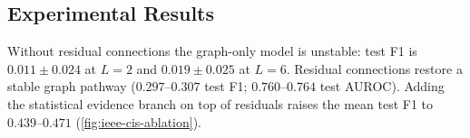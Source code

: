 \subsection{Experimental Results}
\label{sec:ieee-results}

Without residual connections the graph-only model is unstable: test F1 is
$0.011 \pm 0.024$ at $L=2$ and $0.019 \pm 0.025$ at $L=6$.
Residual connections restore a stable graph pathway
($0.297$--$0.307$ test F1; $0.760$--$0.764$ test AUROC).
Adding the statistical evidence branch on top of residuals raises the mean test F1 to
$0.439$--$0.471$
(\cref{fig:ieee-cis-ablation}).

